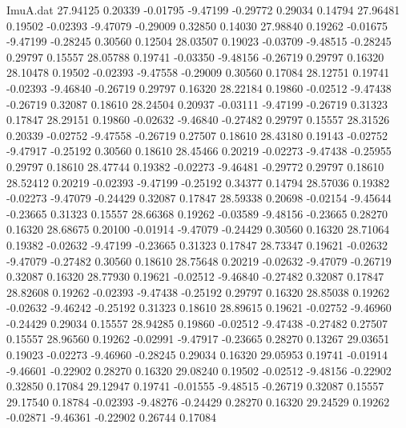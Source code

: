 \begin{filecontents}{ImuA.dat}
  27.94125    0.20339   -0.01795   -9.47199   -0.29772    0.29034    0.14794
  27.96481    0.19502   -0.02393   -9.47079   -0.29009    0.32850    0.14030
  27.98840    0.19262   -0.01675   -9.47199   -0.28245    0.30560    0.12504
  28.03507    0.19023   -0.03709   -9.48515   -0.28245    0.29797    0.15557
  28.05788    0.19741   -0.03350   -9.48156   -0.26719    0.29797    0.16320
  28.10478    0.19502   -0.02393   -9.47558   -0.29009    0.30560    0.17084
  28.12751    0.19741   -0.02393   -9.46840   -0.26719    0.29797    0.16320
  28.22184    0.19860   -0.02512   -9.47438   -0.26719    0.32087    0.18610
  28.24504    0.20937   -0.03111   -9.47199   -0.26719    0.31323    0.17847
  28.29151    0.19860   -0.02632   -9.46840   -0.27482    0.29797    0.15557
  28.31526    0.20339   -0.02752   -9.47558   -0.26719    0.27507    0.18610
  28.43180    0.19143   -0.02752   -9.47917   -0.25192    0.30560    0.18610
  28.45466    0.20219   -0.02273   -9.47438   -0.25955    0.29797    0.18610
  28.47744    0.19382   -0.02273   -9.46481   -0.29772    0.29797    0.18610
  28.52412    0.20219   -0.02393   -9.47199   -0.25192    0.34377    0.14794
  28.57036    0.19382   -0.02273   -9.47079   -0.24429    0.32087    0.17847
  28.59338    0.20698   -0.02154   -9.45644   -0.23665    0.31323    0.15557
  28.66368    0.19262   -0.03589   -9.48156   -0.23665    0.28270    0.16320
  28.68675    0.20100   -0.01914   -9.47079   -0.24429    0.30560    0.16320
  28.71064    0.19382   -0.02632   -9.47199   -0.23665    0.31323    0.17847
  28.73347    0.19621   -0.02632   -9.47079   -0.27482    0.30560    0.18610
  28.75648    0.20219   -0.02632   -9.47079   -0.26719    0.32087    0.16320
  28.77930    0.19621   -0.02512   -9.46840   -0.27482    0.32087    0.17847
  28.82608    0.19262   -0.02393   -9.47438   -0.25192    0.29797    0.16320
  28.85038    0.19262   -0.02632   -9.46242   -0.25192    0.31323    0.18610
  28.89615    0.19621   -0.02752   -9.46960   -0.24429    0.29034    0.15557
  28.94285    0.19860   -0.02512   -9.47438   -0.27482    0.27507    0.15557
  28.96560    0.19262   -0.02991   -9.47917   -0.23665    0.28270    0.13267
  29.03651    0.19023   -0.02273   -9.46960   -0.28245    0.29034    0.16320
  29.05953    0.19741   -0.01914   -9.46601   -0.22902    0.28270    0.16320
  29.08240    0.19502   -0.02512   -9.48156   -0.22902    0.32850    0.17084
  29.12947    0.19741   -0.01555   -9.48515   -0.26719    0.32087    0.15557
  29.17540    0.18784   -0.02393   -9.48276   -0.24429    0.28270    0.16320
  29.24529    0.19262   -0.02871   -9.46361   -0.22902    0.26744    0.17084

\end{filecontents}
